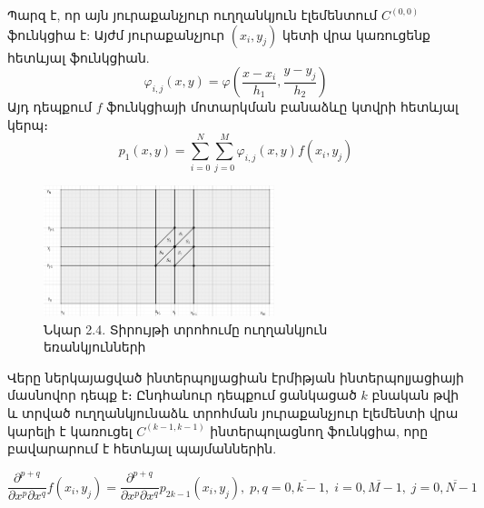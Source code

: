 \documentclass[fleqn, bachelor,subf,12pt,notitlepage]{article}
\begin{document}
Պարզ է, որ այն յուրաքանչյուր ուղղանկյուն էլեմենտում $C^{(0, 0)}$ ֆունկցիա է:
Այժմ յուրաքանչյուր $\left(x_{i}, y_{j}\right)$ կետի վրա կառուցենք հետևյալ ֆունկցիան.
\begin{equation}
\varphi_{i,j}(x,y)=\varphi \left(\dfrac{x-x_{i}}{h_{1}}, \dfrac{y-y_{j}}{h_{2}}\right)
\end{equation}
\newpage
Այդ դեպքում $f$ ֆունկցիայի մոտարկման բանաձևը կտվրի հետևյալ կերպ։
\begin{equation}
p_{1}(x,y)=\sum_{i=0}^{N}\sum_{j=0}^{M}\varphi_{i,j}(x,y)f(x_{i}, y_{j})
\end{equation}
\begin{figure}[h!]
\centering
\includegraphics[width=0.6\textwidth]{images/two_var_courant_3}
\captionsetup{labelformat=empty}
\caption{\hfill Նկար 2.4. Տիրույթի տրոհումը ուղղանկյուն եռանկյունների}
\end{figure}

Վերը ներկայացված ինտերպոլյացիան էրմիթյան ինտերպոլյացիայի մասնովոր դեպք է։
Ընդհանուր դեպքում ցանկացած $k$ բնական թվի և տրված ուղղանկյունաձև տրոհման յուրաքանչյուր էլեմենտի վրա կարելի է կառուցել $C^{\left(k-1, k-1\right)}$ ինտերպոլացնող ֆունկցիա, որը բավարարում է հետևյալ պայմաններին.

\begin{equation}
\dfrac{\partial^{p+q}}{\partial x^{p} \partial x^{q}}f\left(x_{i}, y_{j}\right)=\dfrac{\partial^{p+q}}{\partial x^{p} \partial x^{q}}p_{2k-1}\left(x_{i}, y_{j}\right), \; p,q=\overline{0, k-1}, \;  i=\overline{0, M-1}, \; j=\overline{0, N-1}
\end{equation}


\newpage
\end{document}
